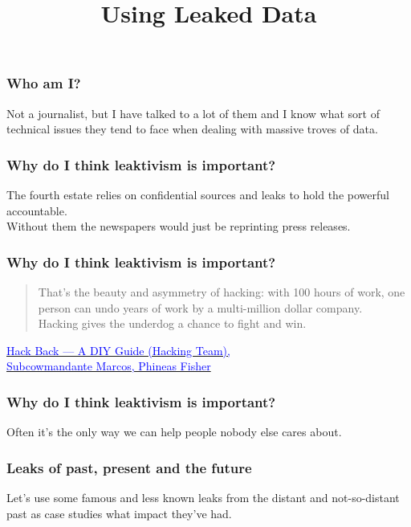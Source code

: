 \documentclass[aspectratio=169,usenames,dvipsnames]{beamer}
\title{Using Leaked Data}
\date{}
\begin{document}
\maketitle

\begin{frame}[c]
  \frametitle{Who am I?}

  Not a journalist\pause, but I have talked to a lot of them and I know what
  sort of technical issues they tend to face when dealing with massive troves
  of data.

\end{frame}

\begin{frame}[c]
  \frametitle{Why do I think leaktivism is important?}

  \pause

  The fourth estate relies on confidential sources and leaks to hold
  the powerful accountable.\pause\\Without them the newspapers would just be
  reprinting press releases.

\end{frame}

\begin{frame}[c]
  \frametitle{Why do I think leaktivism is important?}

  \begin{quote}
    That’s the beauty and asymmetry of hacking: with 100 hours of
    work, one person can undo years of work by a multi-million dollar
    company.\\Hacking gives the underdog a chance to fight and win.
  \end{quote}

  \pause

  \centering
  \small
  \href{https://theanarchistlibrary.org/library/hack-back-subcowmandante-marcos-phineas-fisher-hack-back-a-diy-guide-hacking-team}{
    \textcolor{blue}{Hack Back — A DIY Guide (Hacking Team),\\Subcowmandante
    Marcos, Phineas Fisher}}

\end{frame}

\begin{frame}[c]
  \frametitle{Why do I think leaktivism is important?}

  Often it's the only way we can help people nobody else cares about.

\end{frame}

\begin{frame}[c]
  \frametitle{Leaks of past, present and the future}

  Let's use some famous and less known leaks from the distant and
  not-so-distant past as case studies what impact they've had.

\end{frame}
\end{document}
